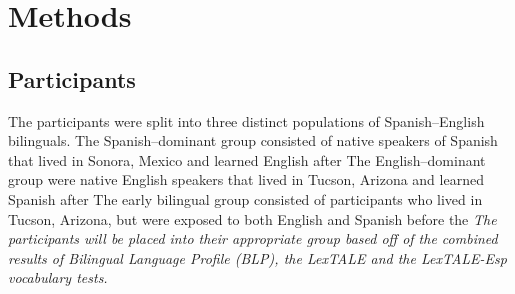 \documentclass[
12pt, %
english, %
doublespacing, %
nolistspacing, %
liststotoc, %
headsepline, %
chapterinoneline, %
openany, %
]{DoctoralThesis}\usepackage[]{graphicx}\usepackage[]{color}
\begin{document}


\section{Methods}


\subsection{Participants}

The participants were split into three distinct populations of Spanish–English bilinguals. The Spanish–dominant group consisted of native speakers of Spanish that lived in Sonora, Mexico and learned English after %
The English–dominant group were native English speakers that lived in Tucson, Arizona and learned Spanish after %
The early bilingual group consisted of participants who lived in Tucson, Arizona, but were exposed to both English and Spanish before the %
\emph{The participants will be placed into their appropriate group based off of the combined results of Bilingual Language Profile (BLP), the LexTALE and the LexTALE-Esp vocabulary tests.} 
\end{document}
